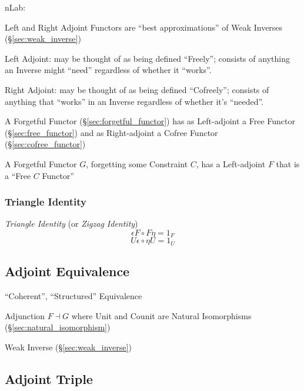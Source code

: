 nLab:

Left and Right Adjoint Functors are ``best approximations'' of Weak
Inverses (\S\ref{sec:weak_inverse})

Left Adjoint: may be thought of as being defined ``Freely''; consists
of anything an Inverse might ``need'' regardless of whether it
``works''.

Right Adjoint: may be thought of as being defined ``Cofreely'';
consists of anything that ``works'' in an Inverse regardless of
whether it's ``needed''.

A Forgetful Functor (\S\ref{sec:forgetful_functor}) has as
Left-adjoint a Free Functor (\S\ref{sec:free_functor}) and as
Right-adjoint a Cofree Functor (\S\ref{sec:cofree_functor})

A Forgetful Functor $G$, forgetting some Constraint $C$, has a
Left-adjoint $F$ that is a ``Free $C$ Functor'' %



\subsubsection{Triangle Identity}\label{sec:triangle_identity}

\emph{Triangle Identity} (or \emph{Zigzag Identity})
\[
  \epsilon F \circ F \eta = 1_F
\]\[
  U \epsilon \circ \eta U = 1_U
\]



\subsection{Adjoint Equivalence}\label{sec:adjoint_equivalence}

``Coherent'', ``Structured'' Equivalence

Adjunction $F \dashv G$ where Unit and Counit are Natural Isomorphisms
(\S\ref{sec:natural_isomorphism})

Weak Inverse (\S\ref{sec:weak_inverse})



\subsection{Adjoint Triple}\label{sec:adjoint_triple}

